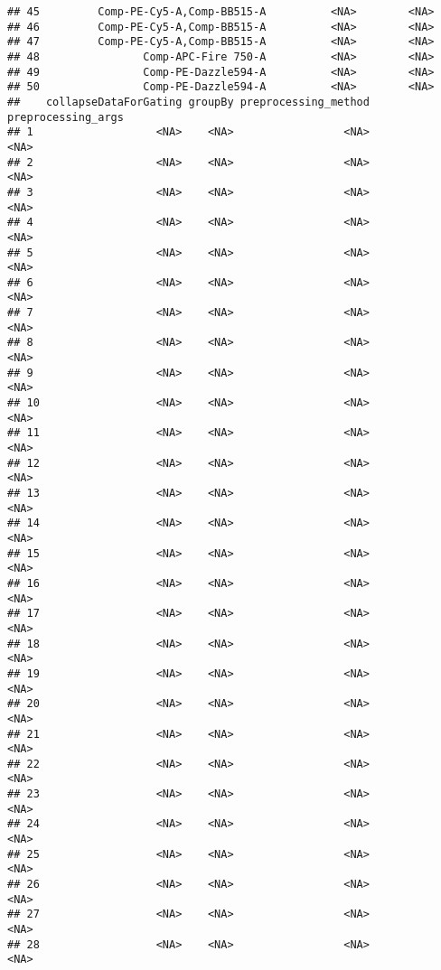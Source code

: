 \documentclass[]{book}
\begin{document}
\begin{verbatim}
## 45         Comp-PE-Cy5-A,Comp-BB515-A          <NA>        <NA>
## 46         Comp-PE-Cy5-A,Comp-BB515-A          <NA>        <NA>
## 47         Comp-PE-Cy5-A,Comp-BB515-A          <NA>        <NA>
## 48                Comp-APC-Fire 750-A          <NA>        <NA>
## 49                Comp-PE-Dazzle594-A          <NA>        <NA>
## 50                Comp-PE-Dazzle594-A          <NA>        <NA>
##    collapseDataForGating groupBy preprocessing_method preprocessing_args
## 1                   <NA>    <NA>                 <NA>               <NA>
## 2                   <NA>    <NA>                 <NA>               <NA>
## 3                   <NA>    <NA>                 <NA>               <NA>
## 4                   <NA>    <NA>                 <NA>               <NA>
## 5                   <NA>    <NA>                 <NA>               <NA>
## 6                   <NA>    <NA>                 <NA>               <NA>
## 7                   <NA>    <NA>                 <NA>               <NA>
## 8                   <NA>    <NA>                 <NA>               <NA>
## 9                   <NA>    <NA>                 <NA>               <NA>
## 10                  <NA>    <NA>                 <NA>               <NA>
## 11                  <NA>    <NA>                 <NA>               <NA>
## 12                  <NA>    <NA>                 <NA>               <NA>
## 13                  <NA>    <NA>                 <NA>               <NA>
## 14                  <NA>    <NA>                 <NA>               <NA>
## 15                  <NA>    <NA>                 <NA>               <NA>
## 16                  <NA>    <NA>                 <NA>               <NA>
## 17                  <NA>    <NA>                 <NA>               <NA>
## 18                  <NA>    <NA>                 <NA>               <NA>
## 19                  <NA>    <NA>                 <NA>               <NA>
## 20                  <NA>    <NA>                 <NA>               <NA>
## 21                  <NA>    <NA>                 <NA>               <NA>
## 22                  <NA>    <NA>                 <NA>               <NA>
## 23                  <NA>    <NA>                 <NA>               <NA>
## 24                  <NA>    <NA>                 <NA>               <NA>
## 25                  <NA>    <NA>                 <NA>               <NA>
## 26                  <NA>    <NA>                 <NA>               <NA>
## 27                  <NA>    <NA>                 <NA>               <NA>
## 28                  <NA>    <NA>                 <NA>               <NA>

\end{verbatim}
\end{document}
